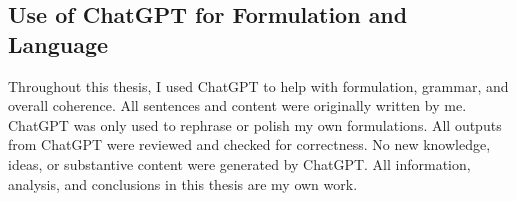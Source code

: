 \begin{appendices}
\subsection*{Use of ChatGPT for Formulation and Language}

Throughout this thesis, I used ChatGPT to help with formulation, grammar, and overall coherence. All sentences and content were originally written by me. ChatGPT was only used to rephrase or polish my own formulations. All outputs from ChatGPT were reviewed and checked for correctness. No new knowledge, ideas, or substantive content were generated by ChatGPT. All information, analysis, and conclusions in this thesis are my own work.


\end{appendices}
